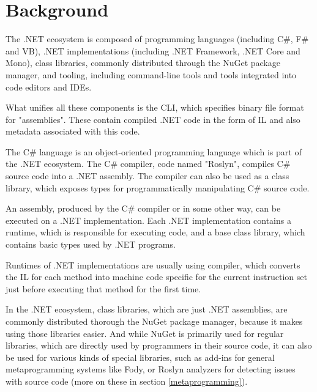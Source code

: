 \chapter{Background}

The .NET ecosystem is composed of programming languages (including C\#, F\# and \acl{VB}), \cite{tour} .NET implementations (including .NET Framework, .NET Core and Mono), \cite{implementations} class libraries, commonly distributed through the NuGet package manager, and tooling, including command-line tools and tools integrated into code editors and \acp{IDE}.

What unifies all these components is the \ac{CLI}, \cite{ecma-335} which specifies binary file format for "assemblies". These contain compiled .NET code in the form of \ac{IL} and also metadata associated with this code.

\medskip

The C\# language \cite{csharp-spec} is an object-oriented programming language which is part of the .NET ecosystem.
The C\# compiler, code named "Roslyn", \cite{roslyn} compiles C\# source code into a .NET assembly. The compiler can also be used as a class library, which exposes types for programmatically manipulating C\# source code.

\medskip

An assembly, produced by the C\# compiler or in some other way, can be executed on a .NET implementation. Each .NET implementation contains a runtime, which is responsible for executing code, and a base class library, which contains basic types used by .NET programs.

Runtimes of .NET implementations are usually using  compiler, which converts the \ac{IL} for each method into machine code specific for the current instruction set just before executing that method for the first time. %

\medskip

In the .NET ecosystem, class libraries, which are just .NET assemblies, are commonly distributed thorough the NuGet package manager, \cite{nuget} because it makes using those libraries easier.
And while NuGet is primarily used for regular libraries, which are directly used by programmers in their source code, it can also be used for various kinds of special libraries, such as add-ins for general metaprogramming systems like Fody, or Roslyn analyzers for detecting issues with source code (more on these in section \ref{metaprogramming}).


